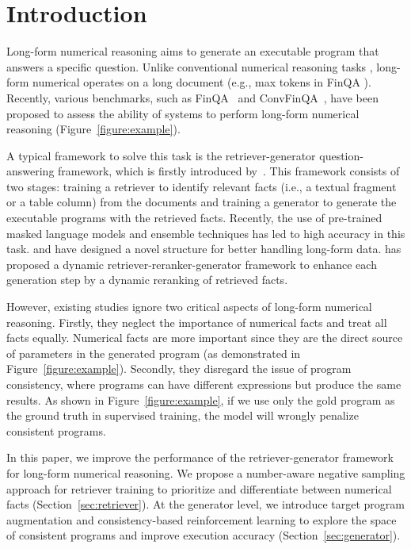 \documentclass[11pt]{article}
\begin{document}
\section{Introduction}
Long-form numerical reasoning aims to generate an executable program that answers a specific question. Unlike conventional numerical reasoning tasks \cite{mackenzie2008engine}, long-form numerical operates on a long document (e.g., max  tokens in FinQA \cite{chen2021finqa}). Recently, various benchmarks, such as FinQA~\cite{chen2021finqa} and ConvFinQA~\cite{convfinqa}, have been proposed to assess the ability of systems to perform long-form numerical reasoning (Figure~\ref{figure:example}). 






A typical framework to solve this task is the retriever-generator question-answering framework, which is firstly introduced by~\citet{chen2021finqa}. 
This framework consists of two stages: training a retriever to identify relevant facts (i.e., a textual fragment or a table column) from the documents and training a generator to generate the executable programs with the retrieved facts. Recently, the use of pre-trained masked language models and ensemble techniques \cite{wang2022novel, zhang2022robustly, wang2022numerical} has led to high accuracy in this task. \citet{zhang2022elastic} and \citet{tablet5} have designed a novel structure for better handling long-form data. \citet{dyrren} has proposed a dynamic retriever-reranker-generator framework to enhance each generation step by a dynamic reranking of retrieved facts.




However, existing studies ignore two critical aspects of long-form numerical reasoning. Firstly, they neglect the importance of numerical facts and treat all facts equally. Numerical facts are more important since they are the direct source of parameters in the generated program (as demonstrated in Figure~\ref{figure:example}). Secondly, they disregard the issue of program consistency, where programs can have different expressions but produce the same results. As shown in Figure~\ref{figure:example}, if we use only the gold program as the ground truth in supervised training, the model will wrongly penalize consistent programs.



In this paper, we improve the performance of the retriever-generator framework for long-form numerical reasoning.  We propose a number-aware negative sampling approach for retriever training to prioritize and differentiate between numerical facts (Section~\ref{sec:retriever}). At the generator level, we introduce target program augmentation and consistency-based reinforcement learning to explore the space of consistent programs and improve execution accuracy (Section~\ref{sec:generator}). 
\end{document}
